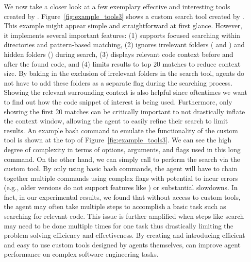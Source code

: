 We now take a closer look at a few exemplary effective and interesting tools created by \tech.
Figure~\ref{fig:example_tools3} shows a custom search tool created by \tech.
This example might appear simple and straightforward at first glance.
However, it implements several important features: (1) supports focused searching within directories and pattern-based matching, (2) ignores irrelevant folders ( and ) and hidden folders () during search, (3) displays relevant code context before and after the found code, and (4) limits results to top 20 matches to reduce context size.
By baking in the exclusion of irrelevant folders in the search tool, agents do not have to add these folders as a separate flag during the searching process.
Showing the relevant surrounding context is also helpful since oftentimes we want to find out how the code snippet of interest is being used.
Furthermore, only showing the first 20 matches can be critically important to not drastically inflate the context window, allowing the agent to easily refine their search to limit results.
An example bash command to emulate the functionality of the custom tool is shown at the top of Figure~\ref{fig:example_tools3}.
We can see the high degree of complexity in terms of options, arguments, and flags used in this long command.
On the other hand, we can simply call  to perform the search via the custom tool.
By only using basic bash commands, the agent will have to chain together multiple commands using complex flags with potential to incur errors (e.g., older  versions do not support features like ) or substantial slowdowns.
In fact, in our experimental results, we found that without access to custom tools, the agent may often take multiple steps to accomplish a basic task such as searching for relevant code.
This issue is further amplified when steps like search may need to be done multiple times for one task thus drastically limiting the problem solving efficiency and effectiveness.
By creating and introducing efficient and easy to use custom tools designed by agents themselves, \tech can improve agent performance on complex software engineering tasks.


